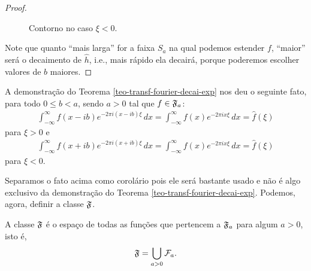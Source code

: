\begin{proof}
\begin{figure}[H]
				\caption{Contorno no caso $\xi < 0$.}
			\end{figure}
            Note que quanto ``mais larga'' for a faixa $S_a$ na qual podemos estender $f$, ``maior'' será o 
            decaimento de $\widehat{h}$, i.e., mais rápido ela decairá, porque poderemos escolher valores de
            $b$ maiores.
        \end{proof}
        \begin{corolario}
        \label{transf-fourier-inv-por-shift}
            A demonstração do Teorema \ref{teo-transf-fourier-decai-exp} nos deu o seguinte fato,
            para todo $0\leq b < a$, sendo $a > 0$ tal que $f\in\mathfrak{F}_a$:
            \begin{align*}
                \int_{-\infty}^{\infty} f(x-ib)e^{-2\pi i(x-ib)\xi} \, dx
                =
                \int_{-\infty}^{\infty} f(x)e^{-2\pi ix\xi} \, dx
                =
                \widehat{f}(\xi)
            \end{align*}
            para $\xi > 0$ e
            \begin{align*}
                \int_{-\infty}^{\infty} f(x+ib)e^{-2\pi i(x+ib)\xi} \, dx
                =
                \int_{-\infty}^{\infty} f(x)e^{-2\pi ix\xi} \, dx
                =
                \widehat{f}(\xi)
            \end{align*}
            para $\xi < 0$.
        \end{corolario}
        Separamos o fato acima como corolário pois ele será bastante usado e não é algo exclusivo da
        demonstração do Teorema \ref{teo-transf-fourier-decai-exp}. Podemos, agora, definir a classe
        $\F$.
        \begin{definicao}[Classe $\F$]
        \label{def-classe-F}
            A classe $\F$ é o espaço de todas as funções que pertencem a $\mathfrak{F}_a$
            para algum $a>0$, isto é,
            \begin{equation*}
                \mathfrak{F} = \bigcup_{a>0} \mathcal{F}_a.
            \end{equation*}
        \end{definicao}
